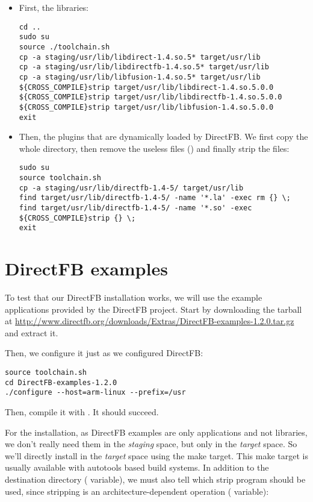 \begin{itemize}

\item First, the libraries:
\small
\begin{verbatim}
cd ..
sudo su
source ./toolchain.sh
cp -a staging/usr/lib/libdirect-1.4.so.5* target/usr/lib
cp -a staging/usr/lib/libdirectfb-1.4.so.5* target/usr/lib
cp -a staging/usr/lib/libfusion-1.4.so.5* target/usr/lib
${CROSS_COMPILE}strip target/usr/lib/libdirect-1.4.so.5.0.0
${CROSS_COMPILE}strip target/usr/lib/libdirectfb-1.4.so.5.0.0
${CROSS_COMPILE}strip target/usr/lib/libfusion-1.4.so.5.0.0
exit
\end{verbatim}
\normalsize

\item Then, the plugins that are dynamically loaded by DirectFB. We
  first copy the whole  directory, then
  remove the useless files () and finally strip the
   files:

\small
\begin{verbatim}
sudo su
source toolchain.sh
cp -a staging/usr/lib/directfb-1.4-5/ target/usr/lib
find target/usr/lib/directfb-1.4-5/ -name '*.la' -exec rm {} \;
find target/usr/lib/directfb-1.4-5/ -name '*.so' -exec ${CROSS_COMPILE}strip {} \;
exit
\end{verbatim}
\normalsize

\end{itemize}
\clearpage
\section{DirectFB examples}

To test that our DirectFB installation works, we will use the example
applications provided by the DirectFB project. Start by downloading
the tarball at
\url{http://www.directfb.org/downloads/Extras/DirectFB-examples-1.2.0.tar.gz}
and extract it.

Then, we configure it just as we configured DirectFB:

\small
\begin{verbatim}
source toolchain.sh
cd DirectFB-examples-1.2.0
./configure --host=arm-linux --prefix=/usr
\end{verbatim}
\normalsize

Then, compile it with .  It should succeed.

For the installation, as DirectFB examples are only applications and
not libraries, we don't really need them in the {\em staging} space,
but only in the {\em target} space. So we'll directly install in the
{\em target} space using the  make target. This
make target is usually available with autotools based build
systems. In addition to the destination directory (
variable), we must also tell which strip program should be used, since
stripping is an architecture-dependent operation (
variable):

